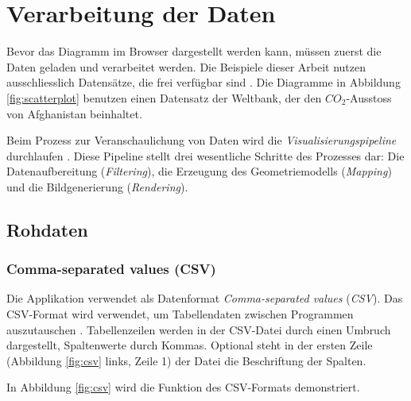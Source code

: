 \section{Verarbeitung der Daten}

Bevor das Diagramm im Browser dargestellt werden kann, müssen zuerst die Daten geladen und verarbeitet werden. Die Beispiele dieser Arbeit nutzen ausschliesslich Datensätze, die frei verfügbar sind \cite{worldbank}.  %
Die Diagramme in Abbildung \ref{fig:scatterplot} benutzen einen Datensatz der Weltbank, der den $CO_2$-Ausstoss von Afghanistan beinhaltet.


Beim Prozess zur Veranschaulichung von Daten wird die \textit{Visualisierungspipeline} durchlaufen \cite[Kapitel 2.1]{viz}. Diese Pipeline stellt drei wesentliche Schritte des Prozesses dar: Die Datenaufbereitung (\textit{Filtering}), die Erzeugung des Geometriemodells (\textit{Mapping}) und die Bildgenerierung (\textit{Rendering}).

\subsection{Rohdaten}

\subsubsection*{Comma-separated values (CSV)}

Die Applikation verwendet als Datenformat \textit{Comma-separated values} (\textit{CSV}). Das CSV-Format wird verwendet, um Tabellendaten zwischen Programmen auszutauschen \cite{csv}. Tabellenzeilen werden in der CSV-Datei durch einen Umbruch dargestellt, Spaltenwerte durch Kommas. Optional steht in der ersten Zeile (Abbildung \ref{fig:csv} links, Zeile 1) der Datei die Beschriftung der Spalten.

In Abbildung \ref{fig:csv} wird die Funktion des CSV-Formats demonstriert.


